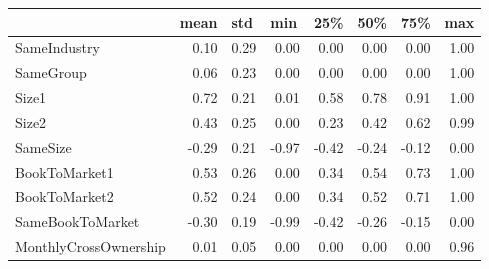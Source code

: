 \begin{tabular}{lrrrrrrr}\hline\hline
          & \multicolumn{1}{l}{mean} & \multicolumn{1}{l}{std} & \multicolumn{1}{l}{min} & 25\%  & 50\%  & 75\%  & \multicolumn{1}{l}{max} \\
          \hline
          
          SameIndustry & 0.10  & 0.29  & 0.00  & 0.00  & 0.00  & 0.00  & 1.00 \\
          SameGroup & 0.06  & 0.23  & 0.00  & 0.00  & 0.00  & 0.00  & 1.00 \\
          Size1 & 0.72  & 0.21  & 0.01  & 0.58  & 0.78  & 0.91  & 1.00 \\
          Size2 & 0.43  & 0.25  & 0.00  & 0.23  & 0.42  & 0.62  & 0.99 \\
          SameSize & -0.29 & 0.21  & -0.97 & -0.42 & -0.24 & -0.12 & 0.00 \\
          BookToMarket1 & 0.53  & 0.26  & 0.00  & 0.34  & 0.54  & 0.73  & 1.00 \\
          BookToMarket2 & 0.52  & 0.24  & 0.00  & 0.34  & 0.52  & 0.71  & 1.00 \\
          SameBookToMarket & -0.30 & 0.19  & -0.99 & -0.42 & -0.26 & -0.15 & 0.00 \\
          MonthlyCrossOwnership & 0.01  & 0.05  & 0.00  & 0.00  & 0.00  & 0.00  & 0.96 \\
          
    
    \hline\hline
            \end{tabular}